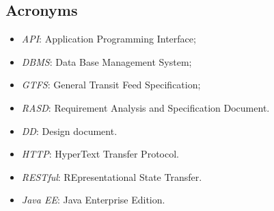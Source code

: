 \subsection{Acronyms}
	\begin{itemize}
	\item \textit{API}: Application Programming Interface;
	\item \textit{DBMS}: Data Base Management System;
	\item \textit{GTFS}: General Transit Feed Specification;
	\item \textit{RASD}: Requirement Analysis and Specification Document.
	\item \textit{DD}: Design document.
	\item \textit{HTTP}: HyperText Transfer Protocol.
	\item \textit{RESTful}: REpresentational State Transfer.
	\item \textit{Java EE}: Java Enterprise Edition.
	\end{itemize}
	
